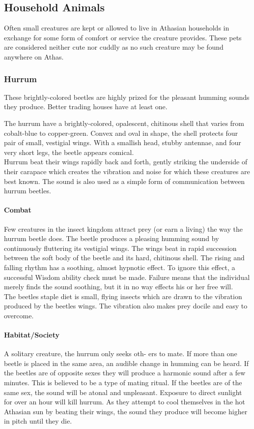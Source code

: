 \subsection{Household Animals}


Often small creatures are kept or allowed to live in Athasian
households in exchange for some form of comfort or service the
creature provides. These pets are considered neither cute nor
cuddly as no such creature may be found anywhere on Athas.

\subsubsection{Hurrum}

These brightly-colored beetles are highly prized for the pleasant
humming sounds they produce. Better trading houses have at
least one.

The hurrum have a brightly-colored, opalescent, chitinous
shell that varies from cobalt-blue to copper-green. Convex and
oval in shape, the shell protects four pair of small, vestigial
wings. With a smallish head, stubby antennae, and four very
short legs, the beetle appears comical.\\
Hurrum beat their wings rapidly back and forth, gently striking
the underside of their carapace which creates the vibration
and noise for which these creatures are best known. The sound
is also used as a simple form of communication between hurrum
beetles.

\paragraph{Combat}
Few creatures in the insect kingdom attract prey (or
earn a living) the way the hurrum beetle does. The beetle produces
a pleasing humming sound by continuously fluttering its
vestigial wings. The wings beat in rapid succession between the
soft body of the beetle and its hard, chitinous shell. The rising
and falling rhythm has a soothing, almost hypnotic effect. To
ignore this effect, a successful Wisdom ability check must be
made. Failure means that the individual merely finds the sound
soothing, but it in no way effects his or her free will.\\
The beetles staple diet is small, flying insects which are
drawn to the vibration produced by the beetles wings. The
vibration also makes prey docile and easy to overcome.

\paragraph{Habitat/Society}
 A solitary creature, the hurrum only seeks oth-
ers to mate. If more than one beetle is placed in the same area, an
audible change in humming can be heard. If the beetles are of opposite
sexes they will produce a harmonic sound after a few minutes.
This is believed to be a type of mating ritual. If the beetles
are of the same sex, the sound will be atonal and unpleasant.
Exposure to direct sunlight for over an hour will kill hurrum.
As they attempt to cool themselves in the hot Athasian sun by
beating their wings, the sound they produce will become higher
in pitch until they die.

